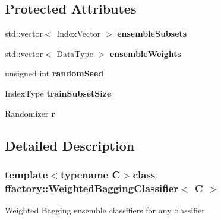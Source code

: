 \subsection*{Protected Attributes}
\begin{DoxyCompactItemize}
\item 
\hypertarget{classffactory_1_1_weighted_bagging_classifier_a92fbe90420ce241a9cd30d4fdfb0746e}{std\-::vector$<$ Index\-Vector $>$ {\bfseries ensemble\-Subsets}}\label{classffactory_1_1_weighted_bagging_classifier_a92fbe90420ce241a9cd30d4fdfb0746e}

\item 
\hypertarget{classffactory_1_1_weighted_bagging_classifier_ace87c620b0398030ae02e5e31774a618}{std\-::vector$<$ Data\-Type $>$ {\bfseries ensemble\-Weights}}\label{classffactory_1_1_weighted_bagging_classifier_ace87c620b0398030ae02e5e31774a618}

\item 
\hypertarget{classffactory_1_1_weighted_bagging_classifier_a62ae261cacb54b46d7c15037e31020e0}{unsigned int {\bfseries random\-Seed}}\label{classffactory_1_1_weighted_bagging_classifier_a62ae261cacb54b46d7c15037e31020e0}

\item 
\hypertarget{classffactory_1_1_weighted_bagging_classifier_a1be29fdf1b274faf2926d0dc8f77dac2}{Index\-Type {\bfseries train\-Subset\-Size}}\label{classffactory_1_1_weighted_bagging_classifier_a1be29fdf1b274faf2926d0dc8f77dac2}

\item 
\hypertarget{classffactory_1_1_weighted_bagging_classifier_a972ff83e14e960f9cbb697817348a14c}{Randomizer {\bfseries r}}\label{classffactory_1_1_weighted_bagging_classifier_a972ff83e14e960f9cbb697817348a14c}

\end{DoxyCompactItemize}


\subsection{Detailed Description}
\subsubsection*{template$<$typename C$>$class ffactory\-::\-Weighted\-Bagging\-Classifier$<$ C $>$}

Weighted Bagging ensemble classifiers for any classifier 


